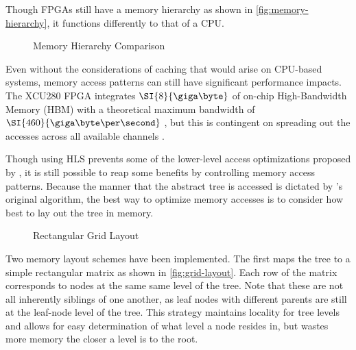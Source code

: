 \label{subsec:memory-layout}

Though FPGAs still have a memory hierarchy as shown in
\autoref{fig:memory-hierarchy}, it functions differently to that of a CPU.

\begin{figure}[h]
	\centering
	
	\caption{Memory Hierarchy Comparison}
	\label{fig:memory-heirarchy}
\end{figure}

Even without the considerations of caching that would arise on CPU-based
systems, memory access patterns can still have significant performance impacts.
The XCU280 FPGA integrates $\SI{8}{\giga\byte}$ of on-chip High-Bandwidth Memory
(HBM) with a theoretical maximum bandwidth of $\SI{460}{\giga\byte\per\second}$
\autocite{u280}, but this is contingent on spreading out the accesses across all
available channels \autocite{holzinger-ipdpsw-2021}.

Though using HLS prevents some of the lower-level access optimizations proposed
by \citeauthor{holzinger-ipdpsw-2021}, it is still possible to reap some
benefits by controlling memory access patterns. Because the manner that the
abstract tree is accessed is dictated by \citeauthor{b-link}'s original
algorithm, the best way to optimize memory accesses is to consider how best to
lay out the tree in memory.

\begin{figure}[h]
	\centering
	
	\caption{Rectangular Grid Layout}
	\label{fig:grid-layout}
\end{figure}

Two memory layout schemes have been implemented. The first maps the tree to a
simple rectangular matrix as shown in \autoref{fig:grid-layout}. Each row of the
matrix corresponds to nodes at the same same level of the tree. Note that these
are not all inherently siblings of one another, as leaf nodes with different
parents are still at the leaf-node level of the tree. This strategy maintains
locality for tree levels and allows for easy determination of what level a node
resides in, but wastes more memory the closer a level is to the root.

%
%
% 	
%


